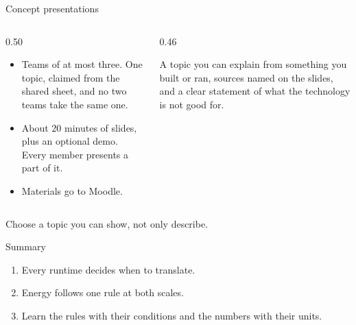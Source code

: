 \documentclass[10pt,aspectratio=169,t]{beamer}
\begin{document}
\begin{frame}[eyebrow=Project]{Concept presentations}
  \vskip 2mm
  \begin{columns}[T]
    \begin{column}{0.50\textwidth}
      \begin{itemize}
        \item Teams of at most three. One topic, claimed from the shared sheet, and no two teams take the same one.
        \item About 20 minutes of slides, plus an optional demo. Every member presents a part of it.
        \item Materials go to Moodle.
      \end{itemize}
    \end{column}
    \begin{column}{0.46\textwidth}
      \begin{hint}
        A topic you can explain from something you built or ran, sources named on the slides, and a clear statement of what the technology is not good for.
      \end{hint}
    \end{column}
  \end{columns}
  \begin{takeaway}{Choose a topic you can show, not only describe.}
  \end{takeaway}
\end{frame}

\begin{frame}[eyebrow=Recap]{Summary}
  \vskip 2mm
  \begin{enumerate}
    \item Every runtime decides when to translate. 
    \item Energy follows one rule at both scales. 
    \item Learn the rules with their conditions and the numbers with their units.
  \end{enumerate}
  \vskip 5mm
\end{frame}

\end{document}
